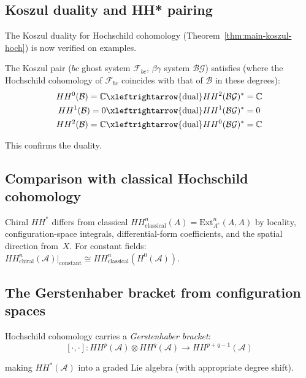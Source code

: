 \subsection{Koszul duality and HH* pairing}

The Koszul duality for Hochschild cohomology (Theorem~\ref{thm:main-koszul-hoch})\label{thm:koszul-duality-HH} is now verified on examples.

\begin{verification}\label{ver:boson-fermion-HH}
The Koszul pair ($bc$ ghost system $\mathcal{F}_{bc}$, $\beta\gamma$ system $\mathcal{BG}$) satisfies (where the Hochschild cohomology of $\mathcal{F}_{bc}$ coincides with that of $\mathcal{B}$ in these degrees):
\begin{align*}
HH^0(\mathcal{B}) = \mathbb{C} &\xleftrightarrow{\text{dual}} HH^2(\mathcal{BG})^* = \mathbb{C}\\
HH^1(\mathcal{B}) = 0 &\xleftrightarrow{\text{dual}} HH^1(\mathcal{BG})^* = 0\\
HH^2(\mathcal{B}) = \mathbb{C} &\xleftrightarrow{\text{dual}} HH^0(\mathcal{BG})^* = \mathbb{C}
\end{align*}

This confirms the duality.
\end{verification}

\subsection{Comparison with classical Hochschild cohomology}

\begin{remark}\label{rem:chiral-vs-classical-hochschild}
Chiral $HH^*$ differs from classical
$HH^n_{\text{classical}}(A) = \mathrm{Ext}^n_{A^e}(A,A)$ by locality,
configuration-space integrals, differential-form coefficients, and the
spatial direction from~$X$.  For constant fields:
$HH^n_{\text{chiral}}(\mathcal{A})|_{\text{constant}} \cong
HH^n_{\text{classical}}(H^0(\mathcal{A}))$.
\end{remark}

\subsection{The Gerstenhaber bracket from configuration spaces}

\begin{theorem}\label{thm:gerstenhaber-structure}
Hochschild cohomology carries a \emph{Gerstenhaber bracket}:
\[[\cdot, \cdot]: HH^p(\mathcal{A}) \otimes HH^q(\mathcal{A}) \to HH^{p+q-1}(\mathcal{A})\]

making $HH^*(\mathcal{A})$ into a graded Lie algebra (with appropriate degree shift).
\end{theorem}

